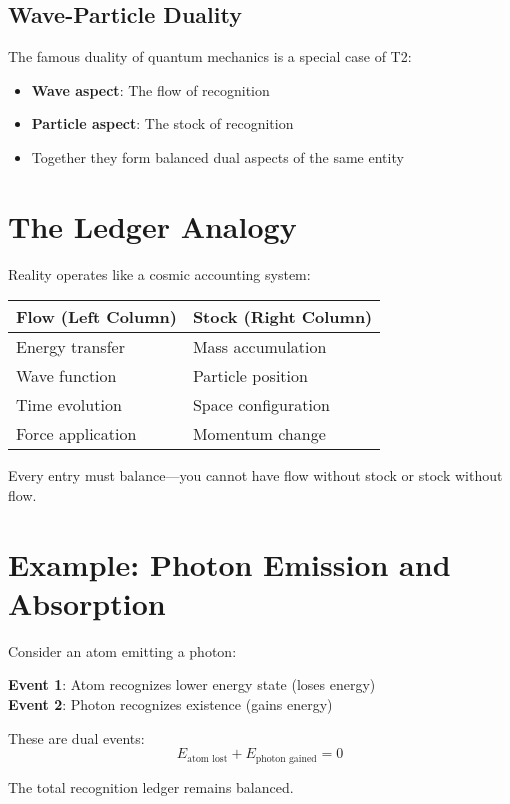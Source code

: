 \documentclass[11pt]{article}
\theoremstyle{definition}
\begin{document}
\subsection{Wave-Particle Duality}
The famous duality of quantum mechanics is a special case of T2:
\begin{itemize}
    \item \textbf{Wave aspect}: The flow of recognition
    \item \textbf{Particle aspect}: The stock of recognition
    \item Together they form balanced dual aspects of the same entity
\end{itemize}

\section{The Ledger Analogy}

Reality operates like a cosmic accounting system:

\begin{center}
\begin{tabular}{|l|l|}
\hline
\textbf{Flow (Left Column)} & \textbf{Stock (Right Column)} \\
\hline
Energy transfer & Mass accumulation \\
Wave function & Particle position \\
Time evolution & Space configuration \\
Force application & Momentum change \\
\hline
\end{tabular}
\end{center}

Every entry must balance—you cannot have flow without stock or stock without flow.

\section{Example: Photon Emission and Absorption}

Consider an atom emitting a photon:

\textbf{Event 1}: Atom recognizes lower energy state (loses energy)\\
\textbf{Event 2}: Photon recognizes existence (gains energy)

These are dual events:
$$E_{\text{atom lost}} + E_{\text{photon gained}} = 0$$

The total recognition ledger remains balanced.
\end{document}
